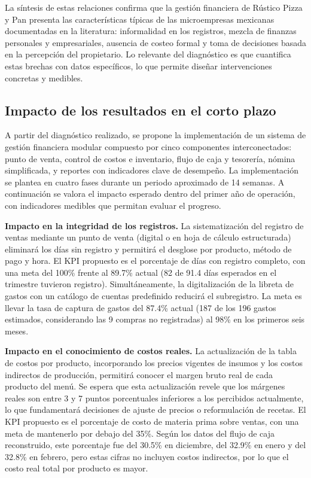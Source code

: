\documentclass[12pt,letterpaper]{article}
\begin{document}
La síntesis de estas relaciones confirma que la gestión financiera de Rústico Pizza y Pan presenta las características típicas de las microempresas mexicanas documentadas en la literatura: informalidad en los registros, mezcla de finanzas personales y empresariales, ausencia de costeo formal y toma de decisiones basada en la percepción del propietario. Lo relevante del diagnóstico es que cuantifica estas brechas con datos específicos, lo que permite diseñar intervenciones concretas y medibles.

\subsection{Impacto de los resultados en el corto plazo}

A partir del diagnóstico realizado, se propone la implementación de un sistema de gestión financiera modular compuesto por cinco componentes interconectados: punto de venta, control de costos e inventario, flujo de caja y tesorería, nómina simplificada, y reportes con indicadores clave de desempeño. La implementación se plantea en cuatro fases durante un periodo aproximado de 14 semanas. A continuación se valora el impacto esperado dentro del primer año de operación, con indicadores medibles que permitan evaluar el progreso.

\textbf{Impacto en la integridad de los registros.} La sistematización del registro de ventas mediante un punto de venta (digital o en hoja de cálculo estructurada) eliminará los días sin registro y permitirá el desglose por producto, método de pago y hora. El KPI propuesto es el porcentaje de días con registro completo, con una meta del 100\% frente al 89.7\% actual (82 de 91.4 días esperados en el trimestre tuvieron registro). Simultáneamente, la digitalización de la libreta de gastos con un catálogo de cuentas predefinido reducirá el subregistro. La meta es llevar la tasa de captura de gastos del 87.4\% actual (187 de los 196 gastos estimados, considerando las 9 compras no registradas) al 98\% en los primeros seis meses.

\textbf{Impacto en el conocimiento de costos reales.} La actualización de la tabla de costos por producto, incorporando los precios vigentes de insumos y los costos indirectos de producción, permitirá conocer el margen bruto real de cada producto del menú. Se espera que esta actualización revele que los márgenes reales son entre 3 y 7 puntos porcentuales inferiores a los percibidos actualmente, lo que fundamentará decisiones de ajuste de precios o reformulación de recetas. El KPI propuesto es el porcentaje de costo de materia prima sobre ventas, con una meta de mantenerlo por debajo del 35\%. Según los datos del flujo de caja reconstruido, este porcentaje fue del 30.5\% en diciembre, del 32.9\% en enero y del 32.8\% en febrero, pero estas cifras no incluyen costos indirectos, por lo que el costo real total por producto es mayor.
\end{document}
